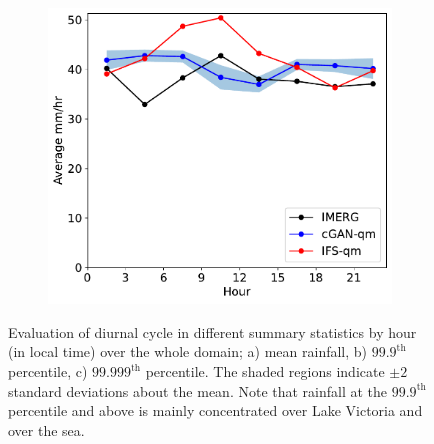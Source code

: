 \documentclass{article}
\begin{document}
\begin{figure}[t]
     \begin{subfigure}[t]{0.32\textwidth}
     \includegraphics[width=\textwidth]{images/diurnal_cycle_quantile_99999_final-nologs_217600.pdf}
     \caption{}
     \end{subfigure}
     \caption{Evaluation of diurnal cycle in different summary statistics by hour (in local time) over the whole domain; a) mean rainfall, b) $99.9^{\text{th}}$ percentile, c) $99.999^{\text{th}}$ percentile. The shaded regions indicate $\pm2$ standard deviations about the mean. Note that rainfall at the $99.9^{\text{th}}$ percentile and above is mainly concentrated over Lake Victoria and over the sea.}
     \label{fig:diurnal}
\end{figure}
\end{document}
